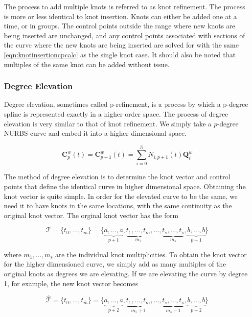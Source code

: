 
The process to add multiple knots is referred to as knot refinement.  The process is more or less identical to knot insertion. Knots can either be added one at a time, or in groups. The control points outside the range where new knots are being inserted are unchanged, and any control points associated with sections of the curve where the new knots are being inserted are solved for with the same \cref{eqn:knotinsertioncpcalc} as the single knot case. It should also be noted that multiples of the same knot can be added without issue.


\subsubsection{Degree Elevation}
Degree elevation, sometimes called p-refinement, is a process by which a p-degree spline is represented exactly in a higher order space. The process of degree elevation is very similar to that of knot refinement. We simply take a $p$-degree NURBS curve and embed it into a higher dimensional space.

\begin{equation}
\label{eqn:degreeelevation}
\mathbf{C}_p^w(t) = \mathbf{C}_{p+1}^w(t) = \sum^{\hat{n}}_{i=0} N_{i,p+1}(t) \mathbf{Q}_i^w
\end{equation}

The method of degree elevation is to determine the knot vector and control points that define the identical curve in higher dimensional space.  Obtaining the knot vector is quite simple. In order for the elevated curve to be the same, we need it to have knots in the same locations, with the same continuity as the original knot vector.  The orginal knot vector has the form

\begin{equation}
	\mathcal{T} = \{t_0,\ldots,t_m\} = \{\underbrace{a,\ldots,a}_{p+1},\underbrace{t_1,\ldots,t_m}_{m_1},\ldots,\underbrace{t_s,\ldots,t_s}_{m_s},\underbrace{b,\ldots,b}_{p+1} \}
\end{equation}

where \(m_1,\ldots,m_s\) are the individual knot multiplicities. To obtain the knot vector for the higher dimensioned curve, we simply add as many multiples of the original knots as degrees we are elevating. If we are elevating the curve by degree 1, for example, the new knot vector becomes

\begin{equation}
\hat{\mathcal{T}} = \{t_0,\ldots,t_{\hat{m}}\} = \{\underbrace{a,\ldots,a}_{p+2},\underbrace{t_1,\ldots,t_m}_{m_1+1},\ldots,\underbrace{t_s,\ldots,t_s}_{m_s+1},\underbrace{b,\ldots,b}_{p+2} \}
\end{equation}

